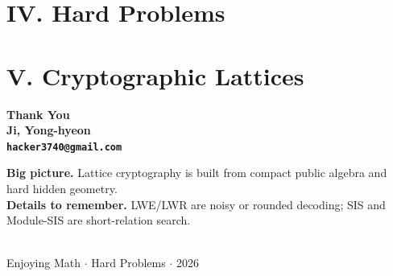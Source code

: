 \documentclass[10pt,aspectratio=1610,compress,dvipsnames]{beamer}
\begin{document}
\section{IV. Hard Problems}


\section{V. Cryptographic Lattices}


\begin{frame}[plain]
  \begin{center}\bfseries\centering
    \vspace{1.35cm}
    {\Huge\color{TealDarkCyan} Thank You}\\[.5cm]
    {\large\color{black} Ji, Yong-hyeon}\\[.3cm]
    {\normalsize\texttt{hacker3740@gmail.com}}\\[.5cm]
    \begin{minipage}{.76\textwidth}
      \small\color{Ink}
      \textbf{Big picture.}\; Lattice cryptography is built from compact public algebra and hard hidden geometry.\\[.2cm]
      \textbf{Details to remember.}\; LWE/LWR are noisy or rounded decoding; SIS and Module-SIS are short-relation search.
    \end{minipage}\\[.5cm]
    {\small\color{gray} Enjoying Math $\cdot$ Hard Problems $\cdot$ 2026}
    \bigskip
  \end{center}
\end{frame}
\end{document}
